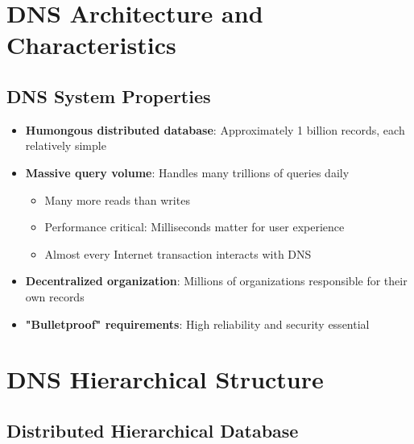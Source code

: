 \documentclass[12pt]{article}
\begin{document}
\section{DNS Architecture and Characteristics}
\subsection{DNS System Properties}

\begin{itemize}
    \item \textbf{Humongous distributed database}: Approximately 1 billion records, each relatively simple
    \item \textbf{Massive query volume}: Handles many trillions of queries daily
          \begin{itemize}
              \item Many more reads than writes
              \item Performance critical: Milliseconds matter for user experience
              \item Almost every Internet transaction interacts with DNS
          \end{itemize}
    \item \textbf{Decentralized organization}: Millions of organizations responsible for their own records
    \item \textbf{"Bulletproof" requirements}: High reliability and security essential
\end{itemize}

\section{DNS Hierarchical Structure}
\subsection{Distributed Hierarchical Database}

\end{document}
